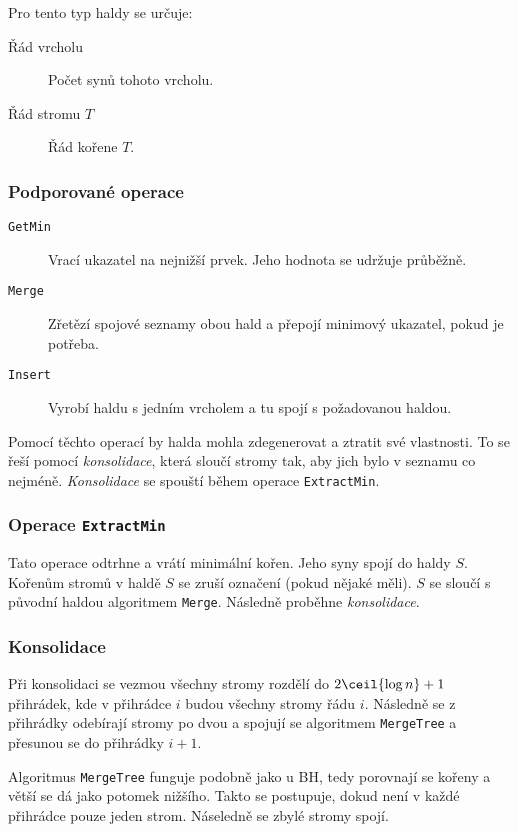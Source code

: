 Pro tento typ haldy se určuje:

\begin{description}
    \item[Řád vrcholu] Počet synů tohoto vrcholu.
    \item[Řád stromu $T$] Řád kořene $T$.
\end{description}

\subsubsection{Podporované operace}

\begin{description}
    \item[\texttt{GetMin}] Vrací ukazatel na nejnižší prvek.
    Jeho hodnota se udržuje průběžně.
    \item[\texttt{Merge}] Zřetězí spojové seznamy obou hald a přepojí minimový ukazatel, pokud je potřeba.
    \item[\texttt{Insert}] Vyrobí haldu s jedním vrcholem a tu spojí s požadovanou haldou.
\end{description}

Pomocí těchto operací by halda mohla zdegenerovat a ztratit své vlastnosti.
To se řeší pomocí \textit{konsolidace}, která sloučí stromy tak, aby jich bylo v seznamu co nejméně.
\textit{Konsolidace} se spouští během operace \texttt{ExtractMin}.

\subsubsection{Operace \texttt{ExtractMin}}

Tato operace odtrhne a vrátí minimální kořen.
Jeho syny spojí do haldy $S$.
Kořenům stromů v haldě $S$ se zruší označení (pokud nějaké měli).
$S$ se sloučí s původní haldou algoritmem \texttt{Merge}.
Následně proběhne \textit{konsolidace}.

\subsubsection{Konsolidace}

Při konsolidaci se vezmou všechny stromy rozdělí do $2\ceil{\log n} + 1$ přihrádek, kde v přihrádce $i$ budou všechny stromy řádu $i$.
Následně se z přihrádky odebírají stromy po dvou a spojují se algoritmem \texttt{MergeTree} a přesunou se do přihrádky $i+1$.

Algoritmus \texttt{MergeTree} funguje podobně jako u BH, tedy porovnají se kořeny a větší se dá jako potomek nižšího.
Takto se postupuje, dokud není v každé přihrádce pouze jeden strom.
Náseledně se zbylé stromy spojí.

